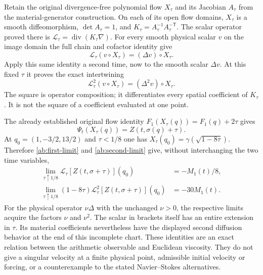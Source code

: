 Retain the original divergence-free polynomial flow $X_\tau$ and its
Jacobian $A_\tau$ from the material-generator construction. On each of
its open flow domains, $X_\tau$ is a smooth diffeomorphism,
$\det A_\tau=1$, and
$K_\tau=A_\tau^{-1}A_\tau^{-\mathsf T}$.
The scalar operator proved there is
$\mathcal L_\tau=\operatorname{div}(K_\tau\nabla)$.
For every smooth physical scalar $v$ on the image domain the full
chain and cofactor identity give
\[
 \mathcal L_\tau(v\circ X_\tau)=(\Delta v)\circ X_\tau.
\]
Apply this same identity a second time, now to the smooth scalar
$\Delta v$. At this fixed $\tau$ it proves the exact intertwining
\[
 \mathcal L_\tau^2(v\circ X_\tau)=(\Delta^2v)\circ X_\tau.
\]
The square is operator composition; it differentiates every spatial
coefficient of $K_\tau$. It is not the square of a coefficient
evaluated at one point.

The already established original flow identity
$F_1(X_\tau(q))=F_1(q)+2\tau$ gives
\[
 \Psi_t(X_\tau(q))=Z(t,\sigma(q)+\tau).
\]
At $q_0=(1,-3/2,13/2)$ and $\tau<1/8$ one has
$X_\tau(q_0)=\gamma(\sqrt{1-8\tau})$.
Therefore \eqref{ab:first-limit} and \eqref{ab:second-limit}
give, without interchanging the two time variables,
\begin{align*}
 \lim_{\tau\uparrow1/8}
 \mathcal L_\tau[Z(t,\sigma+\tau)](q_0)&=-M_1(t)/8,\\
 \lim_{\tau\uparrow1/8}(1-8\tau)
 \mathcal L_\tau^2[Z(t,\sigma+\tau)](q_0)&=-30M_1(t).
\end{align*}
For the physical operator $\nu\Delta$ with the unchanged $\nu>0$,
the respective limits acquire the factors $\nu$ and $\nu^2$.
The scalar in brackets itself has an entire extension in $\tau$.
Its material coefficients nevertheless have the displayed second
diffusion behavior at the end of this incomplete chart.
These identities are an exact relation between the arithmetic observable
and Euclidean viscosity. They do not give a singular velocity at a
finite physical point, admissible initial velocity or forcing, or a
counterexample to the stated Navier--Stokes alternatives.
